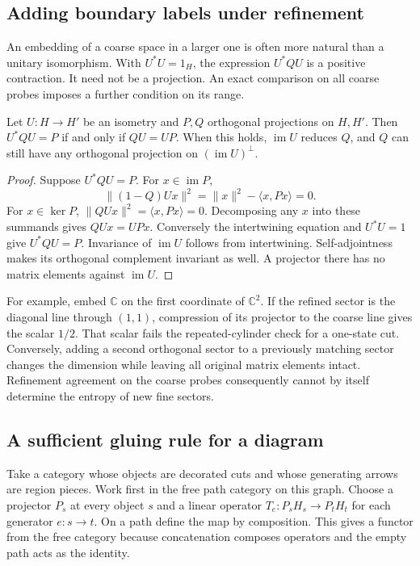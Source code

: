 \documentclass[11pt,letterpaper]{article}
\newcommand{\CC}{\mathbb C}
\newcommand{\im}{\operatorname{im}}
\begin{document}
\subsection{Adding boundary labels under refinement}
An embedding of a coarse space in a larger one is often more natural
than a unitary isomorphism. With \(U^*U=1_H\), the expression \(U^*QU\)
is a positive contraction. It need not be a projection. An exact comparison
on all coarse probes imposes a further condition on its range.

\begin{proposition}
\label{prop:refine}
Let \(U:H\to H'\) be an isometry and \(P,Q\) orthogonal projections on
\(H,H'\). Then \(U^*QU=P\) if and only if \(QU=UP\). When this holds,
\(\im U\) reduces \(Q\), and \(Q\) can still have any orthogonal projection
on \((\im U)^\perp\).
\end{proposition}
\begin{proof}
Suppose \(U^*QU=P\). For \(x\in\im P\),
\[
 \|(1-Q)Ux\|^2=\|x\|^2-\langle x,Px\rangle=0.
\]
For \(x\in\ker P\), \(\|QUx\|^2=\langle x,Px\rangle=0\). Decomposing
any \(x\) into these summands gives \(QUx=UPx\). Conversely the
intertwining equation and \(U^*U=1\) give \(U^*QU=P\).
Invariance of \(\im U\) follows from intertwining. Self-adjointness makes
its orthogonal complement invariant as well. A projector there has no
matrix elements against \(\im U\).
\end{proof}

For example, embed \(\CC\) on the first coordinate of \(\CC^2\).
If the refined sector is the diagonal line through \((1,1)\), compression
of its projector to the coarse line gives the scalar \(1/2\).
That scalar fails the repeated-cylinder check for a one-state cut.
Conversely, adding a second orthogonal sector to a previously matching
sector changes the dimension while leaving all original matrix elements
intact. Refinement agreement on the coarse probes consequently cannot by
itself determine the entropy of new fine sectors.

\subsection{A sufficient gluing rule for a diagram}
Take a category whose objects are decorated cuts and whose generating arrows
are region pieces. Work first in the free path category on this graph.
Choose a projector \(P_s\) at every object \(s\) and a linear operator
\(T_e:P_s H_s\to P_t H_t\) for each generator \(e:s\to t\). On a path
define the map by composition. This gives a functor from the free category because
concatenation composes operators and the empty path acts as the identity.
\end{document}
